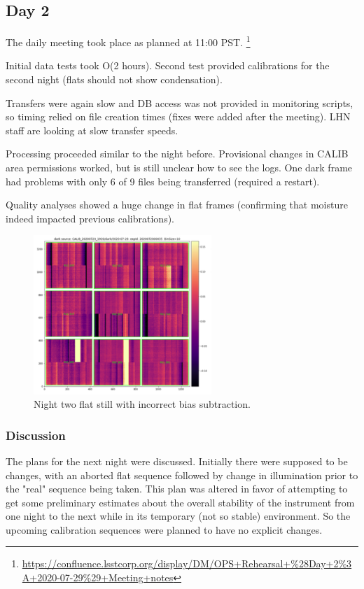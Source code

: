 \subsection{Day 2} \label{sec:day2}

The daily meeting took place as planned at 11:00 PST. \footnote{\url{https://confluence.lsstcorp.org/display/DM/OPS+Rehearsal+\%28Day+2\%3A+2020-07-29\%29+Meeting+notes}}

Initial data tests took O(2 hours).  Second test provided calibrations for the
second night (flats should not show condensation).

Transfers were again slow and DB access was not provided in monitoring scripts, so
timing relied on file creation times (fixes were added after the meeting).  LHN
staff are looking at slow transfer speeds.

Processing proceeded similar to the night before.  Provisional changes in
CALIB area permissions worked, but is still unclear how to see the logs.  One dark frame
had problems with only 6 of 9 files being transferred (required a restart).

Quality analyses showed a huge change in flat frames (confirming that
moisture indeed impacted previous calibrations).


\begin{figure}
\begin{center}
\includegraphics[width=0.6\textwidth]{figures/n2bad}
\end{center}
\caption{Night two flat still with incorrect bias subtraction.\label{fig:d2}}
\end{figure}

\subsubsection{Discussion}

The plans for the next night were discussed.  Initially there were supposed to be
changes, with an aborted flat sequence followed by change in illumination prior to
the "real" sequence being taken.  This plan was altered in favor of attempting to
get some preliminary estimates about the overall stability of the instrument from
one night to the next while in its temporary (not so stable) environment.  So the
upcoming calibration sequences were planned to have no explicit changes.


